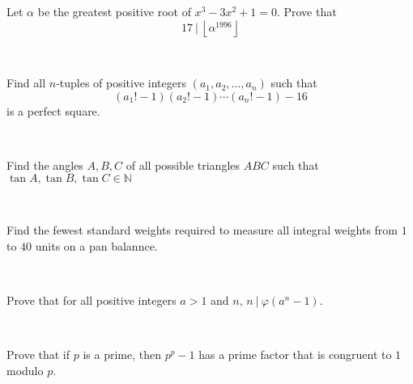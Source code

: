 \begin{problem}
    Let $\alpha$ be the greatest positive root of $x^3 - 3x^2 + 1 = 0$. Prove that $$ 17 \ | \ \left\lfloor \alpha^{1996} \right\rfloor$$ 
\end{problem}

\ 

\begin{problem}
    Find all $n$-tuples of positive integers $(a_1, a_2, \dots, a_n)$ such that $$ (a_1!-1)(a_2!-1) \cdots (a_n!-1) - 16$$ is a perfect square. 
\end{problem}

\

\begin{problem}
    Find the angles $A,B,C$ of all possible triangles $ABC$ such that $\tan{A}, \tan{B}, \tan{C} \in \mathbb{N}$
\end{problem}


\ 

\begin{problem}
    Find the fewest standard weights required to measure all integral weights from $1$ to $40$ units on a pan balannce.
\end{problem}

\ 

\begin{problem}
    Prove that for all positive integers $a > 1$ and $n$, $n \ | \ \varphi(a^n-1)$.
\end{problem}

\ 

\begin{problem}
    Prove that if $p$ is a prime, then $p^p -1$ has a prime factor that is congruent to $1$ modulo $p$.
\end{problem}

